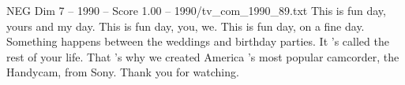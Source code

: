 \begin{textsample}{NEG Dim 7 – 1990 – Score 1.00 – 1990/tv\_com\_1990\_89.txt}  \label{ex:f7_neg_036}
This is fun day, yours and my day.
This is fun day, you, we.
This is fun day, on a fine day.
Something happens between the weddings and birthday parties.
It 's called the rest of your life.
That 's why we created America 's most popular camcorder, the Handycam, from Sony.
Thank you for watching.

\end{textsample}

